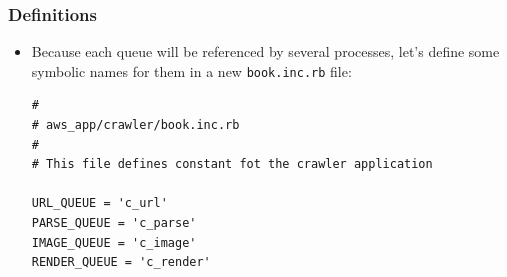 \documentclass{beamer}
\begin{document}
\begin{frame}
\frametitle{Definitions}

\lstset{language=Ruby, style=eclipse}

\begin{itemize}
\item Because each queue will be referenced by several processes, let’s define some symbolic names for them in a new  \texttt{book.inc.rb} file:

\begin{lstlisting}[escapechar=&]
#
# aws_app/crawler/book.inc.rb
#
# This file defines constant fot the crawler application

URL_QUEUE = 'c_url'
PARSE_QUEUE = 'c_parse'
IMAGE_QUEUE = 'c_image'
RENDER_QUEUE = 'c_render'
\end{lstlisting}

\end{itemize}


\end{frame}
\end{document}
